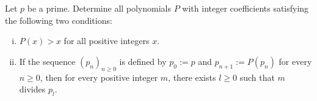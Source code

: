 Let $p$ be a prime. Determine all polynomials $P$ with integer coefficients
satisfying the following two conditions:
\begin{enumerate}[(i)]
    \item $P(x)>x$ for all positive integers $x$.
    \item If the sequence $(p_n)_{n\geq 0}$ is defined by $p_0:=p$ and $p_{n+1}:=P(p_n)$ for every $n\geq 0$,
    then for every positive integer $m$, there exists $l\geq 0$ such that $m$ divides $p_l$. 
\end{enumerate}

